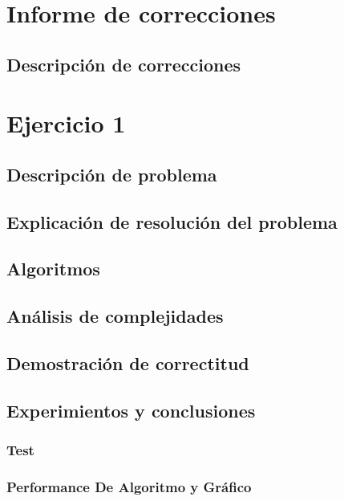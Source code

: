 \documentclass[12pt, a4paper]{article}
\begin{document}
\maketitle
\tableofcontents
\newpage

\newpage
\section{Informe de correcciones} 
\subsection{Descripci\'on de correcciones}

\section{Ejercicio 1} 
\subsection{Descripci\'on de problema}

\subsection{Explicaci\'on de resoluci\'on del problema}

\subsection{Algoritmos}

\subsection{An\'alisis de complejidades}

\subsection{Demostraci\'on de correctitud}

\subsection{Experimientos y conclusiones}
\subsubsection[1.5]{Test}

\subsubsection[1.5]{Performance De Algoritmo y Gr\'afico}

\end{document}
